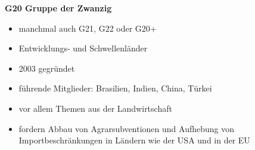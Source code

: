 \vspace{\baselineskip}
\textbf{G20 Gruppe der Zwanzig}
\begin{itemize}
	\item manchmal auch G21, G22 oder G20+
	\item Entwicklungs- und Schwellenländer
	\item 2003 gegründet
	\item führende Mitglieder: Brasilien, Indien, China, Türkei
	\item vor allem Themen aus der Landwirtschaft
	\item fordern Abbau von Agrarsubventionen und Aufhebung von Importbeschränkungen in Ländern wie der USA und in der EU
\end{itemize}
\clearpage
\pagebreak